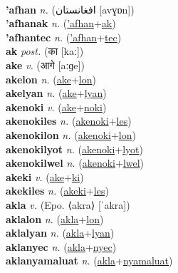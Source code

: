  \label{'aflika'yewlasiatulsetupel} \\
\textbf{'afhan} \textit{n.} ({\arabics{}افغانستان‬} [avɣɒn])
 \label{'afhan} \\
\textbf{'afhanak} \textit{n.} (\hyperref['afhan]{'afhan}+\hyperref[ak]{ak})
 \label{'afhanak} \\
\textbf{'afhantec} \textit{n.} (\hyperref['afhan]{'afhan}+\hyperref[tec]{tec})
 \label{'afhantec} \\
\textbf{ak} \textit{post.} ({\devanagari{}का} [kaː])
 \label{ak} \\
\textbf{ake} \textit{v.} ({\devanagari{}आगे} [aːɡe])
 \label{ake} \\
\textbf{akelon} \textit{n.} (\hyperref[ake]{ake}+\hyperref[lon]{lon})
 \label{akelon} \\
\textbf{akelyan} \textit{n.} (\hyperref[ake]{ake}+\hyperref[lyan]{lyan})
 \label{akelyan} \\
\textbf{akenoki} \textit{v.} (\hyperref[ake]{ake}+\hyperref[noki]{noki})
 \label{akenoki} \\
\textbf{akenokiles} \textit{n.} (\hyperref[akenoki]{akenoki}+\hyperref[les]{les})
 \label{akenokiles} \\
\textbf{akenokilon} \textit{n.} (\hyperref[akenoki]{akenoki}+\hyperref[lon]{lon})
 \label{akenokilon} \\
\textbf{akenokilyot} \textit{n.} (\hyperref[akenoki]{akenoki}+\hyperref[lyot]{lyot})
 \label{akenokilyot} \\
\textbf{akenokilwel} \textit{n.} (\hyperref[akenoki]{akenoki}+\hyperref[lwel]{lwel})
 \label{akenokilwel} \\
\textbf{akeki} \textit{v.} (\hyperref[ake]{ake}+\hyperref[ki]{ki})
 \label{akeki} \\
\textbf{akekiles} \textit{n.} (\hyperref[akeki]{akeki}+\hyperref[les]{les})
 \label{akekiles} \\
\textbf{akla} \textit{v.} (Epo. ⟨akra⟩ [ˈakra])
 \label{akla} \\
\textbf{aklalon} \textit{n.} (\hyperref[akla]{akla}+\hyperref[lon]{lon})
 \label{aklalon} \\
\textbf{aklalyan} \textit{n.} (\hyperref[akla]{akla}+\hyperref[lyan]{lyan})
 \label{aklalyan} \\
\textbf{aklanyec} \textit{n.} (\hyperref[akla]{akla}+\hyperref[nyec]{nyec})
 \label{aklanyec} \\
\textbf{aklanyamaluat} \textit{n.} (\hyperref[akla]{akla}+\hyperref[nyamaluat]{nyamaluat})
 \label{aklanyamaluat} \\
